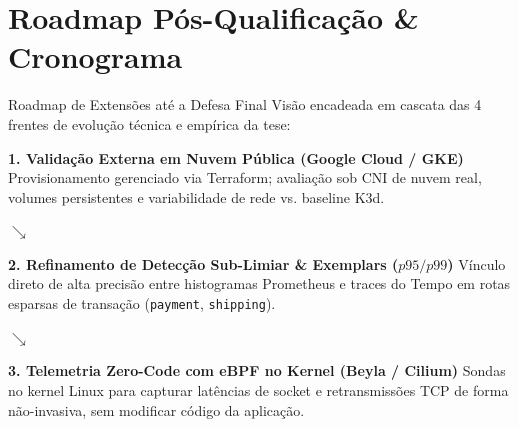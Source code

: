 \documentclass[aspectratio=169, 10pt]{beamer}
\begin{document}
\section{Roadmap Pós-Qualificação \& Cronograma}

\begin{frame}{Roadmap de Extensões até a Defesa Final}
  \vspace{-1ex}
  \small
  Visão encadeada em cascata das 4 frentes de evolução técnica e empírica da tese:
  \vspace{0.6ex}

  \noindent\hspace{0.00\textwidth}%
  \begin{minipage}{0.75\textwidth}
    \begin{block}{\scriptsize \textbf{1. Validação Externa em Nuvem Pública (Google Cloud / GKE)}}
      \footnotesize
      Provisionamento gerenciado via Terraform; avaliação sob CNI de nuvem real, volumes persistentes e variabilidade de rede vs. baseline K3d.
    \end{block}
  \end{minipage}

  \vspace{-0.3ex}
  \hspace{0.05\textwidth}\textcolor{cinRed}{$\boldsymbol{\searrow}$}\\[-0.5ex]
  \hspace{0.08\textwidth}%
  \begin{minipage}{0.75\textwidth}
    \begin{exampleblock}{\scriptsize \textbf{2. Refinamento de Detecção Sub-Limiar \& Exemplars ($p95/p99$)}}
      \footnotesize
      Vínculo direto de alta precisão entre histogramas Prometheus e traces do Tempo em rotas esparsas de transação (\texttt{payment}, \texttt{shipping}).
    \end{exampleblock}
  \end{minipage}

  \vspace{-0.3ex}
  \hspace{0.13\textwidth}\textcolor{cinDarkRed}{$\boldsymbol{\searrow}$}\\[-0.5ex]
  \hspace{0.16\textwidth}%
  \begin{minipage}{0.75\textwidth}
    \begin{block}{\scriptsize \textbf{3. Telemetria Zero-Code com eBPF no Kernel (Beyla / Cilium)}}
      \footnotesize
      Sondas no kernel Linux para capturar latências de socket e retransmissões TCP de forma não-invasiva, sem modificar código da aplicação.
    \end{block}
  \end{minipage}


\end{frame}
\end{document}
